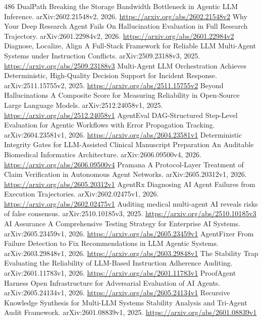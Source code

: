\documentclass[11pt]{article}
\begin{document}
\begin{thebibliography}{486}
 DualPath Breaking the Storage Bandwidth Bottleneck in Agentic LLM Inference. arXiv:2602.21548v2, 2026. \url{https://arxiv.org/abs/2602.21548v2}
 Why Your Deep Research Agent Fails On Hallucination Evaluation in Full Research Trajectory. arXiv:2601.22984v2, 2026. \url{https://arxiv.org/abs/2601.22984v2}
 Diagnose, Localize, Align A Full-Stack Framework for Reliable LLM Multi-Agent Systems under Instruction Conflicts. arXiv:2509.23188v3, 2025. \url{https://arxiv.org/abs/2509.23188v3}
 Multi-Agent LLM Orchestration Achieves Deterministic, High-Quality Decision Support for Incident Response. arXiv:2511.15755v2, 2025. \url{https://arxiv.org/abs/2511.15755v2}
 Beyond Hallucinations A Composite Score for Measuring Reliability in Open-Source Large Language Models. arXiv:2512.24058v1, 2025. \url{https://arxiv.org/abs/2512.24058v1}
 AgentEval DAG-Structured Step-Level Evaluation for Agentic Workflows with Error Propagation Tracking. arXiv:2604.23581v1, 2026. \url{https://arxiv.org/abs/2604.23581v1}
 Deterministic Integrity Gates for LLM-Assisted Clinical Manuscript Preparation An Auditable Biomedical Informatics Architecture. arXiv:2606.09500v4, 2026. \url{https://arxiv.org/abs/2606.09500v4}
 Pramana A Protocol-Layer Treatment of Claim Verification in Autonomous Agent Networks. arXiv:2605.20312v1, 2026. \url{https://arxiv.org/abs/2605.20312v1}
 AgentRx Diagnosing AI Agent Failures from Execution Trajectories. arXiv:2602.02475v1, 2026. \url{https://arxiv.org/abs/2602.02475v1}
 Auditing medical multi-agent AI reveals risks of false consensus. arXiv:2510.10185v3, 2025. \url{https://arxiv.org/abs/2510.10185v3}
 AI Assurance A Comprehensive Testing Strategy for Enterprise AI Systems. arXiv:2605.23459v1, 2026. \url{https://arxiv.org/abs/2605.23459v1}
 AgentFixer From Failure Detection to Fix Recommendations in LLM Agentic Systems. arXiv:2603.29848v1, 2026. \url{https://arxiv.org/abs/2603.29848v1}
 The Stability Trap Evaluating the Reliability of LLM-Based Instruction Adherence Auditing. arXiv:2601.11783v1, 2026. \url{https://arxiv.org/abs/2601.11783v1}
 ProofAgent Harness Open Infrastructure for Adversarial Evaluation of AI Agents. arXiv:2605.24134v1, 2026. \url{https://arxiv.org/abs/2605.24134v1}
 Recursive Knowledge Synthesis for Multi-LLM Systems Stability Analysis and Tri-Agent Audit Framework. arXiv:2601.08839v1, 2025. \url{https://arxiv.org/abs/2601.08839v1}

\end{thebibliography}
\end{document}
